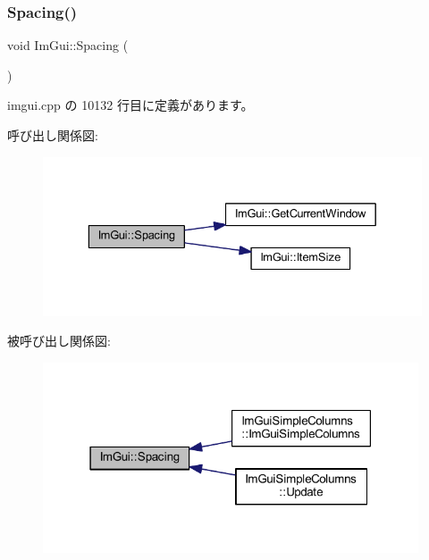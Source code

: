 \subsubsection{\texorpdfstring{Spacing()}{Spacing()}}
{\footnotesize\ttfamily void Im\+Gui\+::\+Spacing (\begin{DoxyParamCaption}{ }\end{DoxyParamCaption})}



 imgui.\+cpp の 10132 行目に定義があります。

呼び出し関係図\+:\nopagebreak
\begin{figure}[H]
\begin{center}
\leavevmode
\includegraphics[width=329pt]{namespace_im_gui_a2659e2bfe84b4cad0facd65d5c1ac90d_cgraph}
\end{center}
\end{figure}
被呼び出し関係図\+:\nopagebreak
\begin{figure}[H]
\begin{center}
\leavevmode
\includegraphics[width=315pt]{namespace_im_gui_a2659e2bfe84b4cad0facd65d5c1ac90d_icgraph}
\end{center}
\end{figure}
\mbox{\label{namespace_im_gui_a1cf931a42a10f71150def3ce222434b6}} 
